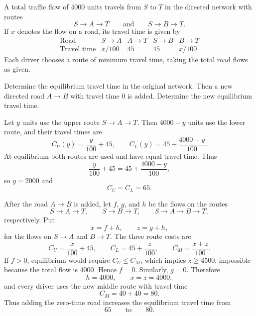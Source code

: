     \begin{expectedproblem}
        A total traffic flow of $4000$ units travels from $S$ to $T$ in the
        directed network with routes
        \[
            S\to A\to T
            \qquad\text{and}\qquad
            S\to B\to T.
        \]
        If $x$ denotes the flow on a road, its travel time is given by
        \[
            \begin{array}{c|cccc}
                \text{Road}
                & S\to A & A\to T & S\to B & B\to T\\
                \hline
                \text{Travel time}
                & x/100 & 45 & 45 & x/100
            \end{array}
        \]
        Each driver chooses a route of minimum travel time, taking the total
        road flows as given.

        Determine the equilibrium travel time in the original network. Then a
        new directed road $A\to B$ with travel time $0$ is added. Determine the
        new equilibrium travel time.
    \end{expectedproblem}

    \begin{solution}
        Let $y$ units use the upper route $S\to A\to T$. Then $4000-y$
        units use the lower route, and their travel times are
        \[
            C_U(y)=\frac{y}{100}+45,
            \qquad
            C_L(y)=45+\frac{4000-y}{100}.
        \]
        At equilibrium both routes are used and have equal travel time. Thus
        \[
            \frac{y}{100}+45
            =
            45+\frac{4000-y}{100},
        \]
        so $y=2000$ and
        \[
            C_U=C_L=65.
        \]

        After the road $A\to B$ is added, let $f$, $g$, and $h$ be the flows on
        the routes
        \[
            S\to A\to T,
            \qquad
            S\to B\to T,
            \qquad
            S\to A\to B\to T,
        \]
        respectively. Put
        \[
            x=f+h,
            \qquad
            z=g+h,
        \]
        for the flows on $S\to A$ and $B\to T$. The three route costs are
        \[
            C_U=\frac{x}{100}+45,
            \qquad
            C_L=45+\frac{z}{100},
            \qquad
            C_M=\frac{x+z}{100}.
        \]
        If $f>0$, equilibrium would require $C_U\leq C_M$, which implies
        $z\geq4500$, impossible because the total flow is $4000$. Hence
        $f=0$. Similarly, $g=0$. Therefore
        \[
            h=4000,
            \qquad
            x=z=4000,
        \]
        and every driver uses the new middle route with travel time
        \[
            C_M=40+40=80.
        \]
        Thus adding the zero-time road increases the equilibrium travel time
        from
        \[
            \boxed{65}
            \qquad\text{to}\qquad
            \boxed{80}.
        \]
    \end{solution}


